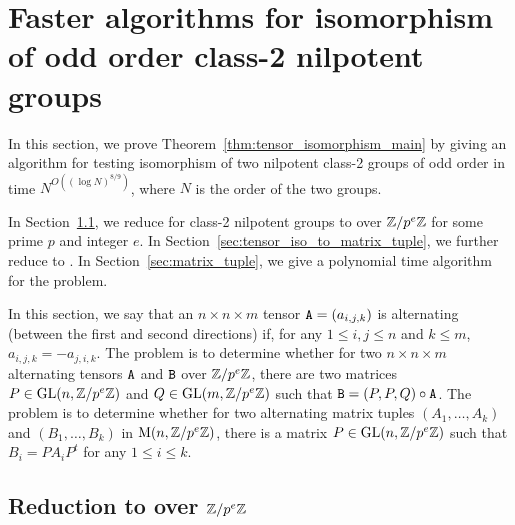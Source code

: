 
\section{Faster algorithms for isomorphism of odd order class-2 nilpotent groups}
 

In this section, we prove Theorem~\ref{thm:tensor_isomorphism_main} by giving an algorithm for testing isomorphism of two nilpotent class-2 groups of odd order in time $N^{O((\log N)^{8/9})}$, where $N$ is the order of the two groups.

In Section~\ref{sec:group_iso_to_tensor_iso}, we reduce  for class-2 nilpotent groups to  over $\mathbb{Z}/p^e \mathbb{Z}$ for some prime $p$ and integer $e$. 
In Section~\ref{sec:tensor_iso_to_matrix_tuple}, we further reduce  to . 
In Section~\ref{sec:matrix_tuple}, we give a polynomial time algorithm for the  problem. 

In this section, we say that
an $n \times n \times m$ tensor $\mathtt{A} = (a_{i, j, k})$ is alternating (between the first and second directions) if, for any $1 \leq i, j \leq n$ and $k \leq m$, $a_{i, j, k} = -a_{j, i, k}$. 
The  problem %
is to determine  whether for two $n \times n \times m$ alternating tensors $\mathtt{A}$ and $\mathtt{B}$ over $\mathbb{Z} / p^e \mathbb{Z}$, there are two matrices $P \in \mathrm{GL}(n, \mathbb{Z} / p^e \mathbb{Z})$ and $Q \in \mathrm{GL}(m, \mathbb{Z} / p^e \mathbb{Z})$ such that $\mathtt{B} = (P, P, Q) \circ \mathtt{A}$.
The  problem %
is to determine whether for two alternating matrix tuples $(A_1, \dots, A_k)$ and $(B_1, \dots, B_k)$ in $\mathrm{M}(n, \mathbb{Z} / p^e \mathbb{Z})$, there is a matrix $P \in \mathrm{GL}(n, \mathbb{Z} / p^e \mathbb{Z})$ such that $B_i = P A_i P^t$ for any $1 \leq i \leq k$.


\subsection{Reduction to  over $\mathbb{Z}/p^e \mathbb{Z}$}\label{sec:group_iso_to_tensor_iso}


